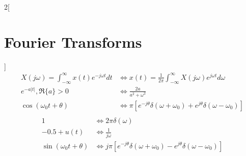 \documentclass{article}
\begin{document}
    \begin{multicols}{2}[\section*{Fourier Transforms}]
		\begin{align*}
            X(j \omega)=\int_{-\infty}^\infty x(t) e^{-j \omega t}d t & \Leftrightarrow x(t)=\frac{1}{2 \pi} \int_{-\infty}^{\infty} X(j \omega)e^{j \omega t}d \omega\\
            e^{-a|t|}, \Re\{a\}>0 & \Leftrightarrow \frac{2a}{a^2 + \omega^2}\\
            \cos (\omega_0 t + \theta) & \Leftrightarrow \pi \left[ e^{-j \theta}\delta(\omega+\omega_0)+e^{j \theta}\delta(\omega-\omega_0) \right]\\
		\end{align*}
        \begin{align*}
            1 & \Leftrightarrow 2\pi\delta(\omega)\\
            -0.5 + u(t) & \Leftrightarrow \frac{1}{j \omega}\\
            \sin (\omega_0 t + \theta) & \Leftrightarrow j \pi \left[ e^{-j \theta}\delta(\omega +\omega_0)-e^{j \theta}\delta(\omega-\omega_0) \right]
        \end{align*}
\end{multicols}
\end{document}
